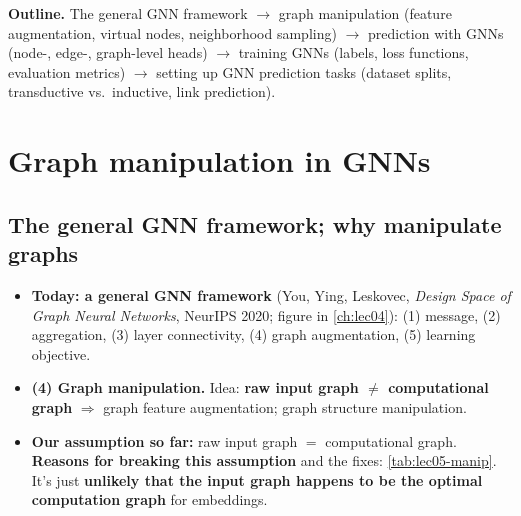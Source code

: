 \label{ch:lec05}


\textbf{Outline.} The general GNN framework $\to$ graph manipulation (feature
augmentation, virtual nodes, neighborhood sampling) $\to$ prediction with GNNs
(node-, edge-, graph-level heads) $\to$ training GNNs (labels, loss functions,
evaluation metrics) $\to$ setting up GNN prediction tasks (dataset splits,
transductive vs.\ inductive, link prediction).

\section{Graph manipulation in GNNs}\label{sec:lec05-manip}

\subsection{The general GNN framework; why manipulate graphs}\label{sec:lec05-why}

\begin{itemize}
  \item \textbf{Today: a general GNN framework} (You, Ying, Leskovec,
    \emph{Design Space of Graph Neural Networks}, NeurIPS 2020; figure in
    \cref{ch:lec04}): (1) message, (2) aggregation, (3) layer connectivity,
    (4) graph augmentation, (5) learning objective.
  \item \textbf{(4) Graph manipulation.} Idea: \textbf{raw input graph $\neq$
    computational graph} $\Rightarrow$ graph feature augmentation; graph
    structure manipulation.
  \item \textbf{Our assumption so far:} raw input graph $=$ computational graph.
    \textbf{Reasons for breaking this assumption} and the fixes:
    \cref{tab:lec05-manip}. It's just \textbf{unlikely that the input graph
    happens to be the optimal computation graph} for embeddings.
\end{itemize}

